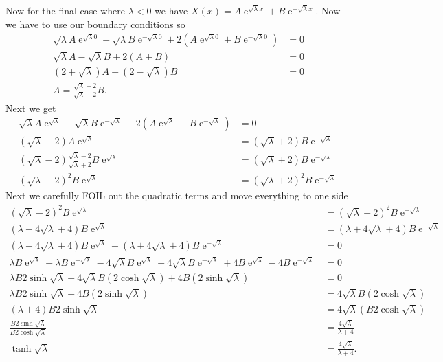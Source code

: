 \documentclass[10pt]{amsart}
\DeclareMathOperator{\E}{e}
\theoremstyle{nonumberplain}
\begin{document}
\begin{enumerate}[label={\bf {\arabic*}:}]
\noindent
Now for the final case where  $\lambda < 0$ we have $X(x) = A\E^{\sqrt \lambda x} + B \E^{ - \sqrt \lambda x}$.
Now we have to use our boundary conditions so
\begin{align*}
\sqrt \lambda A\E^{\sqrt \lambda 0} - \sqrt \lambda B \E^{ - \sqrt \lambda 0} + 2\left(  A\E^{\sqrt \lambda 0} + B \E^{ - \sqrt \lambda 0} \right) &= 0 \\
\sqrt \lambda A - \sqrt \lambda B + 2 (A + B) &= 0 \\
(2 + \sqrt \lambda)A + (2 - \sqrt \lambda) B &= 0 \\
A = \frac {\sqrt \lambda - 2}{\sqrt \lambda + 2} B.
\end{align*}
Next we get
\begin{align*}
\sqrt \lambda A\E^{\sqrt \lambda} - \sqrt \lambda B \E^{ - \sqrt \lambda} - 2\left(  A\E^{\sqrt \lambda} + B \E^{ - \sqrt \lambda} \right) &= 0 \\
(\sqrt \lambda - 2)A \E^{\sqrt \lambda}  &= (\sqrt \lambda + 2) B \E^{ - \sqrt \lambda} \\
(\sqrt \lambda - 2)\frac {\sqrt \lambda - 2}{\sqrt \lambda + 2} B \E^{\sqrt \lambda}  &= (\sqrt \lambda + 2) B \E^{ - \sqrt \lambda} \\
(\sqrt \lambda - 2)^2 B \E^{\sqrt \lambda}  &= (\sqrt \lambda + 2)^2 B \E^{ - \sqrt \lambda}
\end{align*}
Next we carefully FOIL out the quadratic terms and move everything to one side
\begin{align*}
(\sqrt \lambda - 2)^2 B \E^{\sqrt \lambda}  &= (\sqrt \lambda + 2)^2 B \E^{ - \sqrt \lambda} \\
(\lambda -4 \sqrt \lambda + 4) B \E^{\sqrt \lambda}  &= (\lambda +4 \sqrt \lambda + 4) B \E^{ - \sqrt \lambda} \\
(\lambda -4 \sqrt \lambda + 4) B \E^{\sqrt \lambda} - (\lambda +4 \sqrt \lambda + 4) B \E^{ - \sqrt \lambda} &= 0 \\
\lambda B \E^{\sqrt \lambda} - \lambda B \E^{- \sqrt \lambda} -4 \sqrt \lambda B \E^{\sqrt \lambda} - 4\sqrt \lambda B \E^{- \sqrt \lambda} + 4 B \E^{\sqrt \lambda} - 4 B \E^{- \sqrt \lambda} &= 0 \\
\lambda B 2 \sinh \sqrt \lambda -4 \sqrt \lambda B (2\cosh \sqrt \lambda) + 4 B (2 \sinh \sqrt \lambda) &= 0 \\
\lambda B 2 \sinh \sqrt \lambda + 4 B (2 \sinh \sqrt \lambda) &= 4 \sqrt \lambda B (2\cosh \sqrt \lambda)  \\
(\lambda + 4 )B 2 \sinh \sqrt \lambda &= 4 \sqrt \lambda ( B 2\cosh \sqrt \lambda)  \\
\frac{B 2 \sinh \sqrt \lambda}{B 2\cosh \sqrt \lambda} &= \frac{4 \sqrt \lambda }{\lambda + 4 }  \\
\tanh \sqrt \lambda &= \frac{4 \sqrt \lambda }{\lambda + 4 }.
\end{align*}



\end{enumerate}
\end{document}
